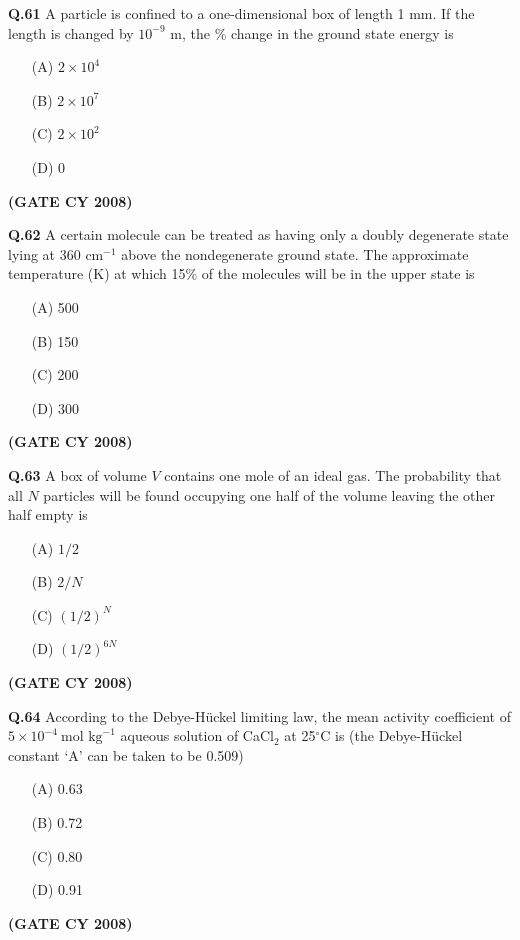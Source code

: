 \documentclass[12pt]{article}
\begin{document}
\begin{enumerate}
\textbf{Q.61} A particle is confined to a one-dimensional box of length 1 mm. If the length is changed by $10^{-9}$ m, the \% change in the ground state energy is

\begin{enumerate}
\item[(A)] $2 \times 10^4$
\item[(B)] $2 \times 10^7$
\item[(C)] $2 \times 10^2$
\item[(D)] 0
\end{enumerate}   \textbf{(GATE CY 2008)}


\vspace{0.5cm}

\textbf{Q.62} A certain molecule can be treated as having only a doubly degenerate state lying at 360 cm$^{-1}$ above the nondegenerate ground state. The approximate temperature (K) at which 15\% of the molecules will be in the upper state is

\begin{enumerate}
\item[(A)] 500
\item[(B)] 150
\item[(C)] 200
\item[(D)] 300
\end{enumerate}   \textbf{(GATE CY 2008)}


\vspace{0.5cm}

\textbf{Q.63} A box of volume $V$ contains one mole of an ideal gas. The probability that all $N$ particles will be found occupying one half of the volume leaving the other half empty is

\begin{enumerate}
\item[(A)] $1/2$
\item[(B)] $2/N$
\item[(C)] $(1/2)^N$
\item[(D)] $(1/2)^{6N}$
\end{enumerate}   \textbf{(GATE CY 2008)}


\vspace{0.5cm}

\textbf{Q.64} According to the Debye-Hückel limiting law, the mean activity coefficient of $5 \times 10^{-4}~\text{mol kg}^{-1}$ aqueous solution of CaCl$_2$ at 25$^\circ$C is (the Debye-Hückel constant ‘A’ can be taken to be 0.509)

\begin{enumerate}
\item[(A)] 0.63
\item[(B)] 0.72
\item[(C)] 0.80
\item[(D)] 0.91
\end{enumerate}   \textbf{(GATE CY 2008)}



\end{enumerate}
\end{document}
